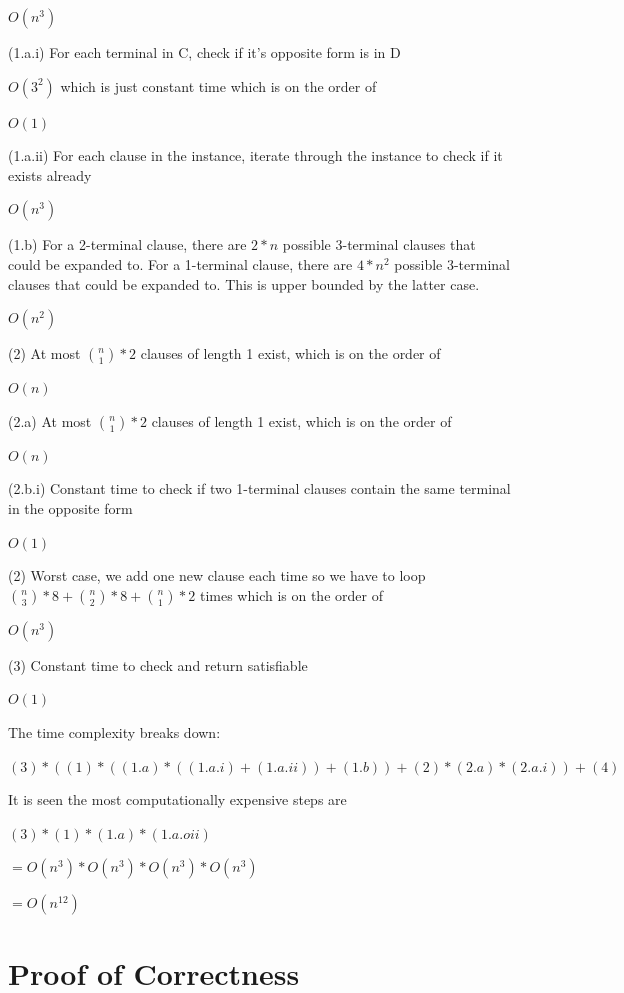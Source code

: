 \documentclass[manuscript]{acmart}
\begin{document}
    $O(n^3)$

    (1.a.i) For each terminal in C, check if it's opposite form is in D

    $O(3^2)$ which is just constant time which is on the order of 

    $O(1)$

    (1.a.ii) For each clause in the instance, iterate through the instance to check if it exists already

    $O(n^3)$

    (1.b) For a 2-terminal clause, there are $2*n$ possible 3-terminal clauses that could be expanded to. For a 1-terminal clause, there are $4*n^2$ possible 3-terminal clauses that could be expanded to. This is upper bounded by the latter case.

    $O(n^2)$

    (2) At most ${\binom{n}{1}} * 2$ clauses of length 1 exist, which is on the order of

    $O(n)$

    (2.a) At most ${\binom{n}{1}} * 2$ clauses of length 1 exist, which is on the order of

    $O(n)$

    (2.b.i) Constant time to check if two 1-terminal clauses contain the same terminal in the opposite form

    $O(1)$

    (2) Worst case, we add one new clause each time so we have to loop ${\binom{n}{3}} * 8 + {\binom{n}{2}} * 8 + {\binom{n}{1}} * 2$ times which is on the order of

    $O(n^3)$

    (3) Constant time to check and return satisfiable

    $O(1)$

    The time complexity breaks down:

    $(3) * ((1) * ((1.a) * ((1.a.i) + (1.a.ii)) + (1.b)) + (2) * (2.a) * (2.a.i)) + (4)$

    It is seen the most computationally expensive steps are 

    $(3) * (1) * (1.a) * (1.a.oii)$

    $ = O(n^3) * O(n^3) * O(n^3) * O(n^3)$

    $= O(n^{12})$

    \section{Proof of Correctness}
\end{document}
